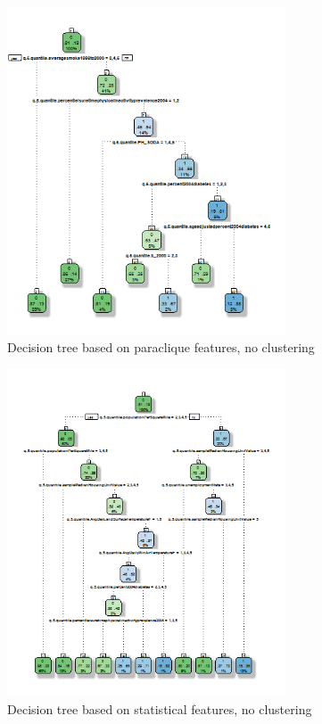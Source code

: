 \documentclass[conference,compsoc]{IEEEtran}
\begin{document}

\begin{figure}[!t]
\centering
\includegraphics[width=3.25in]{decision-tree-01-paraclique-no-clustering.png}
\caption{Decision tree based on paraclique features, no clustering}
\label{decision.tree.01}
\end{figure}

\begin{figure}[!t]
\centering
\includegraphics[width=3.25in]{decision-tree-02-all-no-clustering.png}
\caption{Decision tree based on statistical features, no clustering}
\label{decision.tree.02}
\end{figure}
\end{document}
